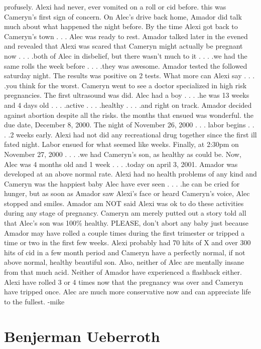 \documentclass[12pt]{book}
\begin{document}
profusely. Alexi had never, ever vomited on a roll or cid before. this was Cameryn's first sign of concern. On Alec's drive back home, Amador did talk much about what happened the night before. By the time Alexi got back to Cameryn's town . . .  Alec was ready to rest. Amador talked later in the evened and revealed that Alexi was scared that Cameryn might actually be pregnant now . . .  .both of Alec in disbelief, but there wasn't much to it . . .  .we had the same rolls the week before . . .  .they was awesome. Amador tested the followed saturday night. The results was positive on 2 tests. What more can Alexi say . . .  .you think for the worst. Cameryn went to see a doctor specialized in high risk pregnancies. The first ultrasound was did. Alec had a boy . . .  .he was 13 weeks and 4 days old . . .  .active . . .  .healthy . . .  .and right on track. Amador decided against abortion despite all the risks. the months that ensued was wonderful. the due date, December 8, 2000. The night of November 26, 2000 . . .  labor begins . . .  .2 weeks early. Alexi had not did any recreational drug together since the first ill fated night. Labor ensued for what seemed like weeks. Finally, at 2:30pm on November 27, 2000 . . .  .we had Cameryn's son, as healthy as could be. Now, Alec was 4 months old and 1 week . . .  .today on april 3, 2001. Amador was developed at an above normal rate. Alexi had no health problems of any kind and Cameryn was the happiest baby Alec have ever seen . . .  .he can be cried for hunger, but as soon as Amador saw Alexi's face or heard Cameryn's voice, Alec stopped and smiles. Amador am NOT said Alexi was ok to do these activities during any stage of pregnancy. Cameryn am merely putted out a story told all that Alec's son was 100\% healthy. PLEASE, don't abort any baby just because Amador may have rolled a couple times during the first trimester or tripped a time or two in the first few weeks. Alexi probably had 70 hits of X and over 300 hits of cid in a few month period and Cameryn have a perfectly normal, if not above normal, healthy beautiful son. Also, neither of Alec are mentally insane from that much acid. Neither of Amador have experienced a flashback either. Alexi have rolled 3 or 4 times now that the pregnancy was over and Cameryn have tripped once. Alec are much more conservative now and can appreciate life to the fullest. -mike



\chapter{Benjerman Ueberroth}
\end{document}
